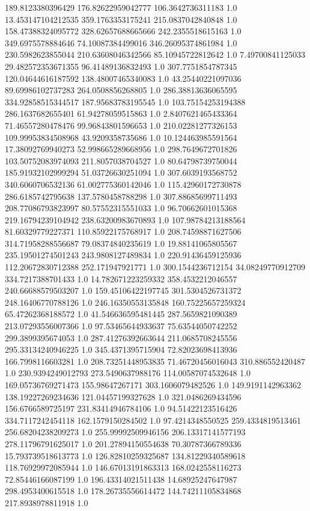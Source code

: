 189.8123380396429	176.82622959042777	106.3642736311183	1.0
13.453147104212535	359.1763353175241	215.0837042840848	1.0
158.47388324095772	328.62657688665666	242.2355518615163	1.0
349.6975578884646	74.10087384499016	346.26095374861984	1.0
230.5982623855044	210.63608046342566	85.10945722812642	1.0
7.49700841125033	29.482572353671355	96.41489136832493	1.0
307.7751854787345	120.04644616187592	138.48007465340083	1.0
43.25440221097036	89.69986102737283	264.0508856268805	1.0
286.38813636065595	334.92858515344517	187.95683783195545	1.0
103.75154253194388	286.1637682655401	61.94278059515863	1.0
2.8407621465433364	71.46557280478476	99.96843801596653	1.0
210.02281277326153	109.99953834508968	43.9209358735686	1.0
10.124463985591564	17.38092769940273	52.998665289668956	1.0
298.7649672701826	103.50752083974093	211.8057038704527	1.0
80.64798739750044	185.91932102999294	51.03726630251094	1.0
307.6039193568752	340.6060706532136	61.002775360142046	1.0
115.42960172730878	286.6185742795638	137.5780458788298	1.0
307.88685699711493	208.77086793823997	80.57552315551033	1.0
96.70662601015368	219.16794239104942	238.63200983670893	1.0
107.98784213188564	81.60329779227371	110.85922175768917	1.0
208.74598871627506	314.71958288556687	79.08374840235619	1.0
19.88141065805567	235.19501274501243	243.9808127489834	1.0
220.91436459125936	112.20672830712388	252.171947921771	1.0
300.1544236712154	34.08249770912709	334.7217388701433	1.0
14.782671223259332	358.4532212046557	240.66688579503207	1.0
159.45106422197745	301.5304526731372	248.16406770788126	1.0
246.16350553135848	160.75225657259324	65.47262368188572	1.0
41.546636595481445	287.5659821090389	213.07293556007366	1.0
97.53465644933637	75.63544050742252	299.3899395674053	1.0
287.41276392663644	211.0685708245556	295.33134240946225	1.0
345.4371395715904	72.82023698413936	166.7998116603281	1.0
208.73251448953835	71.46720456016043	310.886552420487	1.0
230.9394249012793	273.5490637988176	114.00587074532648	1.0
169.05736769271473	155.98647267171	303.1606079482526	1.0
149.9191142963362	138.19227269234636	121.04457199327628	1.0
321.0486269434596	156.6766589725197	231.83414946784106	1.0
94.51422123516426	334.7117242454118	162.1579150284502	1.0
97.4214348550525	259.4334819513461	256.68204238209273	1.0
255.99992509946156	206.13317141577193	278.11796791625017	1.0
201.27894150554638	70.30787366789336	15.793739518613773	1.0
126.82810259325687	134.81229340589618	118.76929972085944	1.0
146.67013191863313	168.0242558116273	72.85446166087199	1.0
196.43314021511438	14.68925247647987	298.4953400615518	1.0
178.26735556614472	144.74211105834868	217.8938978811918	1.0
